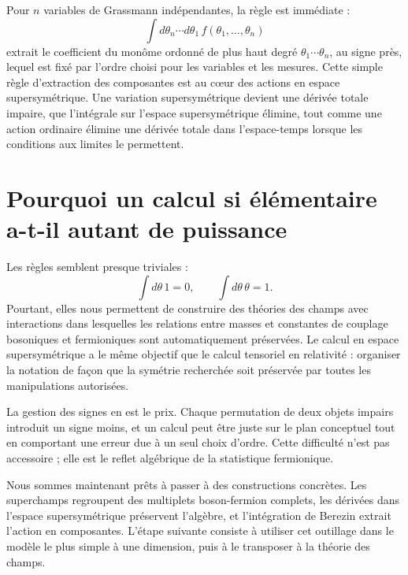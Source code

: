 Pour \(n\) variables de Grassmann indépendantes, la règle est immédiate :
\begin{equation}
\int d\theta_n\cdots d\theta_1\,
f(\theta_1,\ldots,\theta_n)
\end{equation}
extrait le coefficient du monôme ordonné de plus haut degré
\(\theta_1\cdots\theta_n\), au signe près, lequel est fixé par l’ordre choisi pour les variables et les mesures. Cette simple règle d’extraction des composantes est au cœur des actions en espace supersymétrique. Une variation supersymétrique devient une dérivée totale impaire, que l’intégrale sur l’espace supersymétrique élimine, tout comme une action ordinaire élimine une dérivée totale dans l’espace-temps lorsque les conditions aux limites le permettent.

\section{Pourquoi un calcul si élémentaire a-t-il autant de puissance}

Les règles semblent presque triviales :
\begin{equation}
\int d\theta\,1=0,
\qquad
\int d\theta\,\theta=1.
\end{equation}
Pourtant, elles nous permettent de construire des théories des champs avec interactions dans lesquelles les relations entre masses et constantes de couplage bosoniques et fermioniques sont automatiquement préservées. Le calcul en espace supersymétrique a le même objectif que le calcul tensoriel en relativité : organiser la notation de façon que la symétrie recherchée soit préservée par toutes les manipulations autorisées.

La gestion des signes en est le prix. Chaque permutation de deux objets impairs introduit un signe moins, et un calcul peut être juste sur le plan conceptuel tout en comportant une erreur due à un seul choix d’ordre. Cette difficulté n’est pas accessoire ; elle est le reflet algébrique de la statistique fermionique.

\begin{classroomqa}\end{classroomqa}

Nous sommes maintenant prêts à passer à des constructions concrètes. Les superchamps regroupent des multiplets boson-fermion complets, les dérivées dans l’espace supersymétrique préservent l’algèbre, et l’intégration de Berezin extrait l’action en composantes. L’étape suivante consiste à utiliser cet outillage dans le modèle le plus simple à une dimension, puis à le transposer à la théorie des champs.
